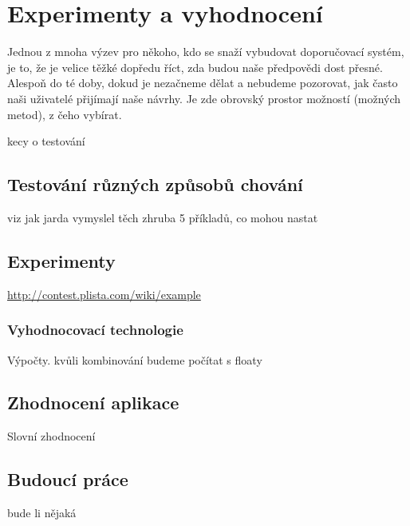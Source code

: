 \documentclass[thesis=M,czech]{FITthesis}[2014/05/07]
\begin{document}
\chapter{Experimenty a vyhodnocení}
\label{chap:tests}

Jednou z mnoha výzev pro někoho, kdo se snaží vybudovat doporučovací systém, je to, že je velice těžké dopředu říct, zda budou naše předpovědi dost přesné. Alespoň do té doby, dokud je nezačneme dělat a nebudeme pozorovat, jak často naši uživatelé přijímají naše návrhy. Je zde obrovský prostor možností (možných metod), z čeho vybírat. 

kecy o testování
\section{Testování různých způsobů chování}
viz jak jarda vymyslel těch zhruba 5 příkladů, co mohou nastat
\section{Experimenty}

\url{http://contest.plista.com/wiki/example}
	\subsection{Vyhodnocovací technologie}	
	Výpočty. kvůli kombinování budeme počítat s floaty
	

\section{Zhodnocení aplikace}
Slovní zhodnocení
\section{Budoucí práce}
bude li nějaká

\begin{conclusion}
\end{conclusion}




\appendix
\end{document}
